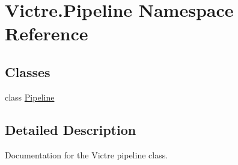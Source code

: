 \hypertarget{namespaceVictre_1_1Pipeline}{\section{Victre.\-Pipeline Namespace Reference}
\label{namespaceVictre_1_1Pipeline}
}
\subsection*{Classes}
\begin{DoxyCompactItemize}
\item 
class \hyperlink{classVictre_1_1Pipeline_1_1Pipeline}{Pipeline}
\end{DoxyCompactItemize}


\subsection{Detailed Description}
\begin{DoxyVerb}Documentation for the Victre pipeline class.
\end{DoxyVerb}
 